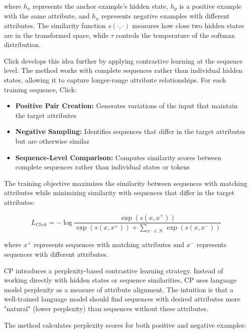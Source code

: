 where $h_a$ represents the anchor example's hidden state, $h_p$ is a positive example with the same attribute, and $h_n$ represents negative examples with different attributes. The similarity function $s(\cdot,\cdot)$ measures how close two hidden states are in the transformed space, while $\tau$ controls the temperature of the softmax distribution.

Click develops this idea further by applying contrastive learning at the sequence level. The method works with complete sequences rather than individual hidden states, allowing it to capture longer-range attribute relationships. For each training sequence, Click:

\begin{itemize}
   \item \textbf{Positive Pair Creation:} Generates variations of the input that maintain the target attributes
   
   \item \textbf{Negative Sampling:} Identifies sequences that differ in the target attributes but are otherwise similar
   
   \item \textbf{Sequence-Level Comparison:} Computes similarity scores between complete sequences rather than individual states or tokens
\end{itemize}

The training objective maximizes the similarity between sequences with matching attributes while minimizing similarity with sequences that differ in the target attributes:

\begin{equation}
   L_{Click} = -\log\frac{\exp(s(x, x^+))}{\exp(s(x, x^+)) + \sum_{x^- \in \mathcal{N}} \exp(s(x, x^-))}
\end{equation}

where $x^+$ represents sequences with matching attributes and $x^-$ represents sequences with different attributes.

CP introduces a perplexity-based contrastive learning strategy. Instead of working directly with hidden states or sequence similarities, CP uses language model perplexity as a measure of attribute alignment. The intuition is that a well-trained language model should find sequences with desired attributes more "natural" (lower perplexity) than sequences without these attributes.

The method calculates perplexity scores for both positive and negative examples:


